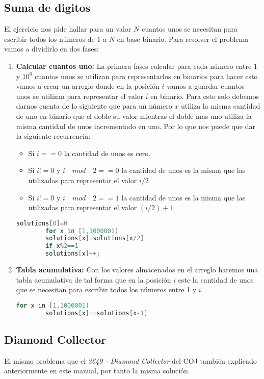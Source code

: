 \subsection{Suma de digitos} El ejercicio nos pide hallar para un valor $N$ cuantos unos se necesitan para escribir todos los números de 1 a $N$ en base binario. Para resolver el problema vamos a dividirlo en dos fases:
\begin{enumerate}
	\item \textbf{Calcular cuantos uno:} La primera fases calcular para cada número entre 1 y $10^{6}$ cuantos unos se utilizan para representarlos en binarios para hacer esto vamos a crear un arreglo donde en la posición $i$ vamos a guardar cuantos unos se utilizan para representar el valor $i$ en binario. Para esto solo debemos darnos cuenta de lo siguiente que para un número $x$ utiliza la misma cantidad de uno en binario que el doble su valor mientras el doble mas uno utiliza la misma cantidad de unos incrementado en uno. Por lo que nos puede que dar la siguiente recurrencia:
	\begin{itemize}
		\item Si $i==0$ la cantidad de unos es cero.
		\item Si $i!=0$ y $i \quad mod \quad 2 ==0 $ la cantidad de unos es la misma que las utilizadas para representar el valor
		$i/2$
		
		\item Si $i!=0$ y $i \quad mod \quad 2 ==1 $ la cantidad de unos es la misma que las utilizadas para representar el valor
		$(i/2) + 1$
	\end{itemize}
	
	\begin{lstlisting}[language=C++]
		solutions[0]=0
		for x in [1,1000001)
		solutions[x]=solutions[x/2]
		if x%2==1
		solutions[x]++; 
	\end{lstlisting} 
	
	\item \textbf{Tabla acumulativa:} Con los valores almacenados en el arreglo haremos una tabla acumulativa de tal forma que en la posición $i$ este la cantidad de unos que se necesitan para  escribir todos los números entre 1 y $i$
	\begin{lstlisting}[language=C++]
		for x in [1,1000001)
		solutions[x]+=solutions[x-1]
	\end{lstlisting} 	
	
\end{enumerate}

\subsection{Diamond Collector} El mismo problema que el \emph{3649 - Diamond Collector} del COJ también explicado anteriormente en este manual, por tanto la misma solución. 

